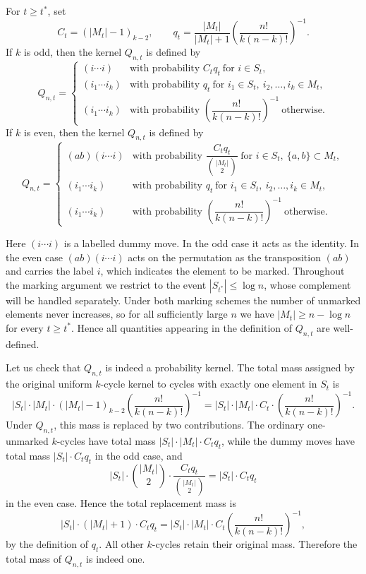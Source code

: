 \begin{defi}
For $t\ge t^*$, set
$$
C_t=(|M_t|-1)_{k-2},
\qquad
q_t=\frac{|M_t|}{|M_t|+1}
\left(\frac{n!}{k(n-k)!}\right)^{-1}.
$$
If $k$ is odd, then the kernel $Q_{n,t}$ is defined by
\[
Q_{n,t}=\begin{cases}
(i\cdots i) & \text{with probability } C_tq_t \ \text{for } i\in S_t,\\[6pt]
(i_1\cdots i_k) & \text{with probability } q_t\ \text{for } i_1\in S_t,\ i_2,\ldots,i_k\in M_t,\\[6pt]
(i_1\cdots i_k) & \text{with probability } \left(\dfrac{n!}{k(n-k)!}\right)^{-1}\ \text{otherwise}.
\end{cases}
\]
If $k$ is even, then the kernel $Q_{n,t}$ is defined by
\[
Q_{n,t}=\begin{cases}
(ab)(i\cdots i) & \text{with probability } \dfrac{C_tq_t}{\binom{|M_t|}{2}}
\ \text{for } i\in S_t,\ \{a,b\}\subset M_t,\\[8pt]
(i_1\cdots i_k) & \text{with probability } q_t\ \text{for } i_1\in S_t,\ i_2,\ldots,i_k\in M_t,\\[6pt]
(i_1\cdots i_k) & \text{with probability } \left(\dfrac{n!}{k(n-k)!}\right)^{-1}\ \text{otherwise}.
\end{cases}
\]

Here $(i\cdots i)$ is a labelled dummy move. In the odd case it acts as the identity. In the even case $(ab)(i\cdots i)$ acts on the permutation as the transposition $(ab)$ and carries the label $i$, which indicates the element to be marked. Throughout the marking argument we restrict to the event $|S_{t^*}|\leq \log n$, whose complement will be handled separately. Under both marking schemes the number of unmarked elements never increases, so for all sufficiently large $n$ we have $|M_t|\geq n-\log n$ for every $t\geq t^*$. Hence all quantities appearing in the definition of $Q_{n,t}$ are well-defined.


Let us check that $Q_{n,t}$ is indeed a probability kernel. The total mass assigned by the original uniform $k$-cycle kernel to cycles with exactly one element in $S_t$ is
$$
|S_t|\cdot|M_t|\cdot(|M_t|-1)_{k-2}
\left(\frac{n!}{k(n-k)!}\right)^{-1}=|S_t|\cdot|M_t|\cdot C_t\cdot
\left(\frac{n!}{k(n-k)!}\right)^{-1}.
$$
Under $Q_{n,t}$, this mass is replaced by two contributions. The ordinary one-unmarked $k$-cycles have total mass $|S_t|\cdot|M_t|\cdot C_t q_t$,
while the dummy moves have total mass
$|S_t|\cdot C_t q_t$ in the odd case, and
$$
|S_t|\cdot \binom{|M_t|}{2}\cdot\frac{C_tq_t}{\binom{|M_t|}{2}}=|S_t|\cdot C_t q_t
$$
in the even case. Hence the total replacement mass is
$$
|S_t|\cdot (|M_t|+1)\cdot C_tq_t=|S_t|\cdot|M_t|\cdot C_t
\left(\frac{n!}{k(n-k)!}\right)^{-1},
$$
by the definition of $q_t$. All other $k$-cycles retain their original mass. Therefore the total mass of $Q_{n,t}$ is indeed one.

\end{defi}

